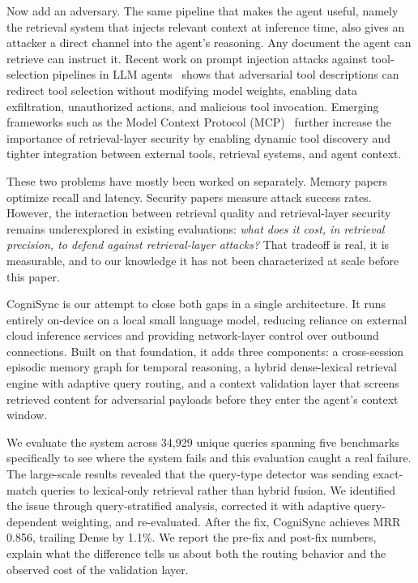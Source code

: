 \documentclass[sigconf]{acmart}
\begin{document}
Now add an adversary. The same pipeline that makes the agent useful,
namely the retrieval system that injects relevant context at inference
time, also gives an attacker a direct channel into the agent's
reasoning. Any document the agent can retrieve can instruct it. Recent work on prompt injection attacks against tool-selection
pipelines in LLM agents~\cite{shi2025toolhijacker}
shows that adversarial tool descriptions can redirect tool
selection without modifying model weights, enabling data
exfiltration, unauthorized actions, and malicious tool invocation. Emerging frameworks such as the Model Context Protocol (MCP)~\cite{hou2025mcp} further increase the importance of retrieval-layer security by enabling dynamic tool discovery and tighter integration between external tools, retrieval systems, and agent context.

These two problems have mostly been worked on separately. Memory papers
optimize recall and latency. Security papers measure attack success
rates. However, the interaction between retrieval quality and retrieval-layer security remains underexplored in existing evaluations:
\emph{what does it cost, in retrieval precision, to defend against
retrieval-layer attacks?} That tradeoff is real, it is measurable, and
to our knowledge it has not been characterized at scale before this
paper.

CogniSync is our attempt to close both gaps in a single architecture. It
runs entirely on-device on a local small language model, 
reducing reliance on external cloud inference services and providing network-layer control over outbound
connections. Built on that foundation, it adds three components: a
cross-session episodic memory graph for temporal reasoning, a hybrid
dense-lexical retrieval engine with adaptive query routing, and a
context validation layer that screens retrieved content for adversarial
payloads before they enter the agent's context window.

We evaluate the system across 34,929 unique queries spanning five benchmarks specifically to see where the system fails and this evaluation caught a real failure. The
large-scale results revealed that the query-type detector was sending
exact-match queries to lexical-only retrieval rather than hybrid fusion.
We identified the issue through query-stratified analysis, corrected it with adaptive
query-dependent weighting, and re-evaluated. After the fix, CogniSync
achieves MRR 0.856, trailing Dense by 1.1\%. We report the pre-fix and
post-fix numbers, explain what the difference tells us about both the
routing behavior and the observed cost of the validation layer.
\end{document}
